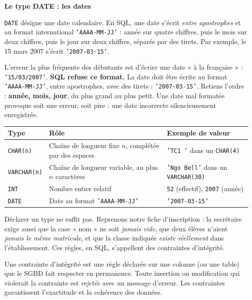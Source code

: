 \documentclass[11pt]{article}
\newcommand{\cle}[1]{{\popxbold\color{popdark}#1}}
\newcounter{popsec}
\newcounter{popsub}
\newcommand{\courssub}[1]{%
  \stepcounter{popsub}%
  \par\vspace{9pt}\noindent{\popxbold\fontsize{11.5}{13}\selectfont\color{popink}{\color{poporange}\thepopsec.\thepopsub}\hspace{6pt}#1}\par\nopagebreak\vspace{4pt}
}
\begin{document}
\textbf{Le type DATE : les dates}\par
\texttt{DATE} désigne une date calendaire. En SQL, une date s'écrit \emph{entre apostrophes} et au format international \texttt{'AAAA-MM-JJ'} : année sur quatre chiffres, puis le mois sur deux chiffres, puis le jour sur deux chiffres, séparés par des tirets. Par exemple, le 15 mars 2007 s'écrit \texttt{'2007-03-15'}.

\begin{attention}
L'erreur la plus fréquente des débutants est d'écrire une date « à la française » : \texttt{'15/03/2007'}. \textbf{SQL refuse ce format.} La date doit être écrite au format \texttt{'AAAA-MM-JJ'}, entre apostrophes, avec des tirets : \texttt{'2007-03-15'}. Retiens l'ordre : \textbf{année, mois, jour}, du plus grand au plus petit. Une date mal formatée provoque soit une erreur, soit pire : une date incorrecte silencieusement enregistrée.
\end{attention}

\begin{center}
\begin{tabularx}{\linewidth}{|l|X|X|}
\hline
\rowcolor{popblueL} \textbf{Type} & \textbf{Rôle} & \textbf{Exemple de valeur} \\
\hline
\texttt{CHAR(n)} & Chaîne de longueur fixe $n$, complétée par des espaces & \texttt{'TC1 '} dans un \texttt{CHAR(4)} \\
\hline
\texttt{VARCHAR(n)} & Chaîne de longueur variable, au plus $n$ caractères & \texttt{'Ngo Bell'} dans un \texttt{VARCHAR(30)} \\
\hline
\texttt{INT} & Nombre entier relatif & \texttt{52} (effectif), \texttt{2007} (année) \\
\hline
\texttt{DATE} & Date au format \texttt{'AAAA-MM-JJ'} & \texttt{'2007-03-15'} \\
\hline
\end{tabularx}
\end{center}

\courssub{Les contraintes d'intégrité}

Déclarer un type ne suffit pas. Reprenons notre fiche d'inscription : la secrétaire exige aussi que la case « nom » ne soit \emph{jamais vide}, que deux élèves n'aient \emph{jamais le même matricule}, et que la classe indiquée \emph{existe réellement} dans l'établissement. Ces règles, en SQL, s'appellent des contraintes d'intégrité.

\begin{definition}
Une \cle{contrainte d'intégrité} est une règle déclarée sur une colonne (ou une table) que le SGBD fait respecter en permanence. Toute insertion ou modification qui violerait la contrainte est \emph{rejetée} avec un message d'erreur. Les contraintes garantissent l'exactitude et la cohérence des données.
\end{definition}
\end{document}
